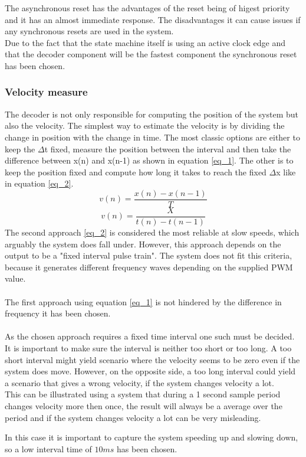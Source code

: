 \documentclass[../../../main]{subfiles}
\begin{document}
The asynchronous reset has the advantages of the reset being of higest priority and it has an almost immediate response.
The disadvantages it can cause issues if any synchronous resets are used in the system. \\

Due to the fact that the state machine itself is using an active clock edge and that the decoder component will be the fastest component the synchronous reset has been chosen.
\subsubsection{Velocity measure}
The decoder is not only responsible for computing the position of the system but also the velocity. The simplest way to estimate the velocity is by dividing the change in position with the change in time. The most classic options are either to keep the $\Delta$t fixed, measure the position between the interval and then take the difference between x(n) and x(n-1) as shown in equation \ref{eq_1}. The other is to keep the position fixed and compute how long it takes to reach the fixed  $\Delta$x like in equation \ref{eq_2}.
\begin{equation}
v(n) = \frac{x(n)-x(n-1)}{T}
\label{eq_1}
\end{equation}
\begin{equation}
  v(n) = \frac{X}{t(n)-t(n-1)}
  \label{eq_2}
\end{equation}
The second approach \ref{eq_2} is considered the most reliable at slow speeds, which arguably the system does fall under. However, this approach depends on the output to be a "fixed interval pulse train"\cite{Velocity_encoder}. The system does not fit this criteria, because it generates different frequency waves depending on the supplied PWM value.\\
\\
The first approach using equation \ref{eq_1} is not hindered by the difference in frequency it has been chosen.  \\
\\
 As the chosen approach requires a fixed time interval one such must be decided. It is important to make sure the interval is neither too short or too long.
 A too short interval might yield scenario where the velocity seems to be zero even if the system does move. However, on the opposite side, a too long interval could yield a scenario that gives a wrong velocity, if the system changes velocity a lot.
\\
This can be illustrated using a system that during a 1 second sample period changes velocity more then once, the result will always be a average over the period and if the system changes velocity a lot can be very misleading.

In this case it is important to capture the system speeding up and slowing down, so a low interval time of $10ms$ has been chosen.
\end{document}
